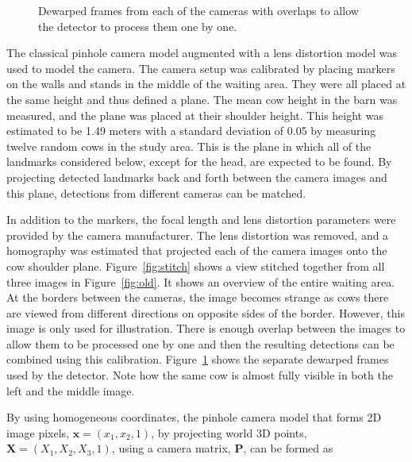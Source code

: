 \documentclass{cta-author}
\begin{document}
\begin{figure}[b]
\begin{center}
\end{center}
  \caption{Dewarped frames from each of the cameras with overlaps to allow the detector to process them one
by one.}
  \label{fig:separate}
\end{figure}



The classical pinhole camera model augmented with a lens distortion model was used to model the camera.
The camera setup was calibrated by placing markers on the walls and stands in the middle of the waiting area. They
were all placed at the same height and thus defined a plane. The mean cow height in the barn was measured,
and the plane was placed at their shoulder height. This height was estimated to be 1.49 meters with a
standard deviation of 0.05 by measuring twelve random cows in the study area.
This is the plane in which all of the landmarks considered below, except for the head, are expected to be
found. By projecting detected landmarks back and forth between the camera images and this plane, detections
from different cameras can be matched.

In addition to the markers, the focal length and lens distortion parameters were provided by the camera
manufacturer.
The lens distortion was removed, and a homography was estimated that projected each of the camera images onto
the cow shoulder plane. Figure~\ref{fig:stitch} shows a view stitched together from all three images in
Figure~\ref{fig:old}. It shows an overview of the entire waiting area. At the borders between the cameras,
the image becomes strange as cows there are viewed from different directions on opposite sides of the border.
However, this image is only used for illustration. There is enough overlap between the images to allow them
to be processed one by one and then the resulting detections can be combined using this calibration.
Figure~\ref{fig:separate} shows the separate dewarped frames used by the detector. Note how the same cow is
almost fully visible in both the left and the middle image.

By using homogeneous coordinates, the pinhole camera model that forms 2D image pixels, $\bm x=\left(x_1, x_2,
1\right)$, by projecting world 3D points, $\bm X=\left(X_1, X_2, X_3, 1\right)$, using a camera matrix, $\bm
P$, can be formed as
\end{document}
